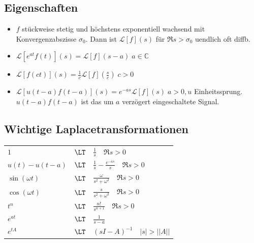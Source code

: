 \begin{sectionbox}
    \subsection{Eigenschaften}
    \begin{itemize}
        \item $f$ stückweise stetig und höchstens exponentiell wachsend mit Konvergenzabszisse $\sigma_0$. Dann ist $\mathcal L[f](s)$ für $\Re{s} > \sigma_0$ uendlich oft diffb.
        \item $\mathcal L[e^{at}f(t)](s)=\mathcal L[f](s-a) \; a\in\mathbb C$
        \item $\mathcal L[f(ct)](s)=\frac{1}{c}\mathcal L[f](\frac{s}{c}) \; c > 0$
        \item $\mathcal L[u(t-a)f(t-a)](s)=e^{-as}\mathcal L[f](s) \; a>0, u$ Einheitssprung.
              $u(t-a)f(t-a)$ ist das um $a$ verzögert eingeschaltete Signal.
    \end{itemize}
\end{sectionbox}

\subsection{Wichtige Laplacetransformationen}
\begin{sectionbox}
    \begin{tabularx}{\linewidth}{lcl}
        $1$              & $\LT$ & $\frac{1}{s} \quad \Re{s} > 0$                   \\
        $u(t) - u(t-a)$  & $\LT$ & $\frac{1}{s}-\frac{e^{-as}}{s} \quad \Re{s} > 0$ \\
        $\sin(\omega t)$ & $\LT$ & $\frac{\omega}{s^2 + \omega^2} \quad \Re{s} > 0$ \\
        $\cos(\omega t)$ & $\LT$ & $\frac{s}{s^2 + \omega^2} \quad \Re{s} > 0$      \\
        $t^n$            & $\LT$ & $\frac{n!}{s^{n+1}} \quad \Re{s} > 0$            \\
        $e^{at}$         & $\LT$ & $\frac{1}{s-a}$                                  \\
        $e^{tA}$         & $\LT$ & $(sI-A)^{-1} \quad |s| > ||A||$
    \end{tabularx}
\end{sectionbox}


